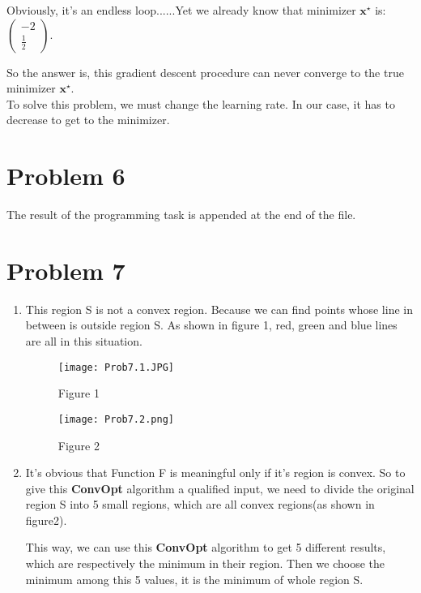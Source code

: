 \documentclass[12pt]{scrartcl}
\newcommand{\vect}[1]{\boldsymbol{#1}}
\newcommand{\ve}{\vect}
\begin{document}
\begin{enumerate}[label=\alph*)]
Obviously, it's an endless loop......Yet we already know that minimizer $\ve{x}^\star$ is:
$\begin{pmatrix}
         -2 \\
        \frac{1}{2} 
 \end{pmatrix}$.

So the answer is, this gradient descent procedure can never converge to the true minimizer $\ve{x}^\star$.\\
To solve this problem, we must change the learning rate. In our case, it has to decrease to get to the minimizer.
\end{enumerate}

    \section*{Problem 6}
The result of the programming task is appended at the end of the file.
    \section*{Problem 7}
\begin{enumerate}[label=\alph*)]
\item
This region S is not a convex region. Because we can find points whose line in between is outside region S. As shown in figure 1, red, green and blue lines are all in this situation.

\begin{figure}[htbp]
\centering
\begin{minipage}[t]{0.48\textwidth}
\centering
\texttt{[image: Prob7.1.JPG]}
\caption{Figure 1}
\end{minipage}
\begin{minipage}[t]{0.48\textwidth}
\centering
\texttt{[image: Prob7.2.png]}
\caption{Figure 2}
\end{minipage}
\end{figure}

\item
It's obvious that Function F is meaningful only if it's region is convex. So to give this \textbf{ConvOpt} algorithm a qualified input, we need to divide the original region S into 5 small regions, which are all convex regions(as shown in figure2).


This way, we can use this \textbf{ConvOpt} algorithm to get 5 different results, which are respectively the minimum in their region. Then we choose the minimum among this 5 values, it is the minimum of whole region S.
\end{enumerate}
\end{document}
